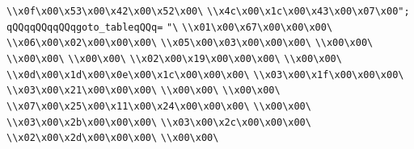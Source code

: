 \verb|\\x0f\x00\x53\x00\x42\x00\x52\x00\|\newline
\verb|\\x4c\x00\x1c\x00\x43\x00\x07\x00";|\newline
\verb|qQQqqQQqqQQqgoto_tableqQQq=|\newline
\verb|"\|\newline
\verb|\\x01\x00\x67\x00\x00\x00\|\newline
\verb|\\x06\x00\x02\x00\x00\x00\|\newline
\verb|\\x05\x00\x03\x00\x00\x00\|\newline
\verb|\\x00\x00\|\newline
\verb|\\x00\x00\|\newline
\verb|\\x00\x00\|\newline
\verb|\\x02\x00\x19\x00\x00\x00\|\newline
\verb|\\x00\x00\|\newline
\verb|\\x0d\x00\x1d\x00\x0e\x00\x1c\x00\x00\x00\|\newline
\verb|\\x03\x00\x1f\x00\x00\x00\|\newline
\verb|\\x03\x00\x21\x00\x00\x00\|\newline
\verb|\\x00\x00\|\newline
\verb|\\x00\x00\|\newline
\verb|\\x07\x00\x25\x00\x11\x00\x24\x00\x00\x00\|\newline
\verb|\\x00\x00\|\newline
\verb|\\x03\x00\x2b\x00\x00\x00\|\newline
\verb|\\x03\x00\x2c\x00\x00\x00\|\newline
\verb|\\x02\x00\x2d\x00\x00\x00\|\newline
\verb|\\x00\x00\|\newline
